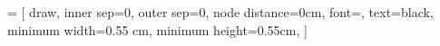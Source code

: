 \usepackage{graphicx}
\usepackage{subfig}

\usepackage{media9}

\usepackage{xcolor}

\usepackage{minted}

\fboxsep=5mm  %

\usepackage{tikz}
\usetikzlibrary{
  arrows,
  positioning,
  shadows,
  backgrounds,
  calc,
  decorations,
  decorations.pathreplacing
}

 = [
draw,
inner sep=0,
outer sep=0,
node distance=0cm,
font=\small,
text=black,
minimum width=0.55 cm,
minimum height=0.55cm,
]

\usepackage{ifthen}
